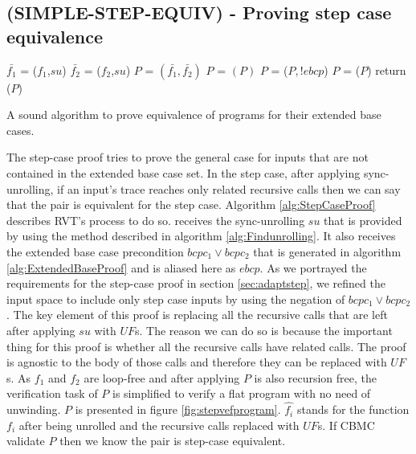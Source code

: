 \subsection{(SIMPLE-STEP-EQUIV) - Proving step case equivalence}
\label{sec:SIMPLE-STEP-EQUIV}
\noindent
\begin{algorithm}
\begin{minipage}{\linewidth}
\begin{algorithmic}[1]
	\State$\bar{f_1}$ = ($f_1$,$su$)
	\State$\bar{f_2}$ = ($f_2$,$su$)
	\State $P$ = $(\bar{f_1},\bar{f_2})$
	\State $P$ = $(P)$
	\State $P$ = ($P,!ebcp$)
    \State $P$ = ($P$)
    \State return ($P$)
	\EndFunction
\end{algorithmic}
\end{minipage}
\caption{A sound algorithm to prove equivalence of programs for their extended base cases.}
\label{alg:StepCaseProof}
\end{algorithm}
The step-case proof tries to prove the general case for inputs that are not contained in the extended base case set. In the step case, after applying sync-unrolling, if an input's trace reaches only related recursive calls then we can say that the pair is equivalent for the step case. Algorithm \ref{alg:StepCaseProof} describes RVT's process to do so.
 receives the sync-unrolling $su$ that is provided by using the method described in algorithm \ref{alg:Findunrolling}. It also receives the extended base case precondition $bcpc_1 \lor bcpc_2$ that is generated in algorithm \ref{alg:ExtendedBaseProof} and is aliased here as $ebcp$. As we portrayed the requirements for the step-case proof in section \ref{sec:adaptstep}, we refined the input space to include only step case inputs by using the negation of $bcpc_1 \lor bcpc_2$. The key element of this proof is replacing all the recursive calls that are left after applying $su$ with $UF$s. The reason we can do so is because the important thing for this proof is whether all the recursive calls have related calls. The proof is agnostic to the body of those calls and therefore they can be replaced with $UF$s. As $f_1$ and $f_2$ are loop-free and after applying  $P$ is also recursion free, the verification task of $P$ is simplified to verify a flat program with no need of unwinding. $P$ is presented in figure \ref{fig:stepvefprogram}. $\hat{f_i}$ stands for the function $f_i$ after being unrolled and the recursive calls replaced with $UF$s. If CBMC validate $P$ then we know the pair is step-case equivalent. 
